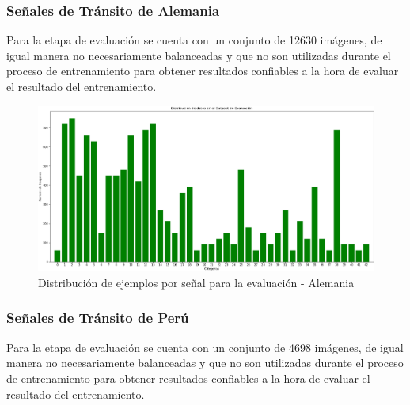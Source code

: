 		\subsubsection{Señales de Tránsito de Alemania}
		Para la etapa de evaluación se cuenta con un conjunto de 12630 imágenes, de igual manera no necesariamente balanceadas y que no son utilizadas durante el proceso de entrenamiento para obtener resultados confiables a la hora de evaluar el resultado del entrenamiento. 

		\begin{figure}[H]
			\includegraphics[width=1\textwidth]{images/desarrollo/histograms/initialTest12630}
			\begin{center}
			\caption{\small{Distribución de ejemplos por señal para la evaluación - Alemania}}
			{\small{\fontsize{10}{16.8}\selectfont {Fuente: Elaboración propia}}}
			\end{center}
			\vspace{-1.5em}
		\end{figure}

		\subsubsection{Señales de Tránsito de Perú}
		Para la etapa de evaluación se cuenta con un conjunto de 4698 imágenes, de igual manera no necesariamente balanceadas y que no son utilizadas durante el proceso de entrenamiento para obtener resultados confiables a la hora de evaluar el resultado del entrenamiento. 

